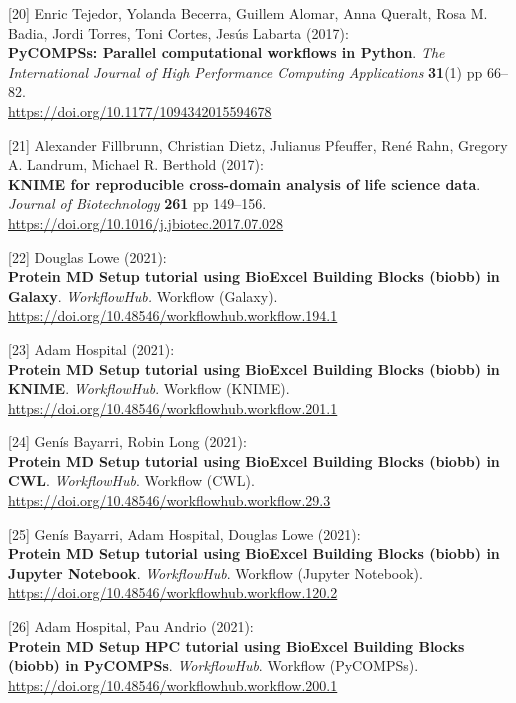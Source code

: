 {[}20{]} Enric Tejedor, Yolanda Becerra, Guillem Alomar, Anna Queralt,
Rosa M. Badia, Jordi Torres, Toni Cortes, Jesús Labarta (2017):\\
\textbf{PyCOMPSs: Parallel computational workflows in Python}. \emph{The
International Journal of High Performance Computing Applications}
\textbf{31}(1) pp 66--82.\\
\url{https://doi.org/10.1177/1094342015594678}

{[}21{]} Alexander Fillbrunn, Christian Dietz, Julianus Pfeuffer, René
Rahn, Gregory A. Landrum, Michael R. Berthold (2017):\\
\textbf{KNIME for reproducible cross-domain analysis of life science
data}. \emph{Journal of Biotechnology} \textbf{261} pp 149--156.\\
\url{https://doi.org/10.1016/j.jbiotec.2017.07.028}

{[}22{]} Douglas Lowe (2021):\\
\textbf{Protein MD Setup tutorial using BioExcel Building Blocks (biobb)
in Galaxy}. \emph{WorkflowHub.} Workflow (Galaxy).\\
\url{https://doi.org/10.48546/workflowhub.workflow.194.1}

{[}23{]} Adam Hospital (2021):\\
\textbf{Protein MD Setup tutorial using BioExcel Building Blocks (biobb)
in KNIME}. \emph{WorkflowHub}. Workflow (KNIME).\\
\url{https://doi.org/10.48546/workflowhub.workflow.201.1}

{[}24{]} Genís Bayarri, Robin Long (2021):\\
\textbf{Protein MD Setup tutorial using BioExcel Building Blocks (biobb)
in CWL}. \emph{WorkflowHub}. Workflow (CWL).\\
\url{https://doi.org/10.48546/workflowhub.workflow.29.3}

{[}25{]} Genís Bayarri, Adam Hospital, Douglas Lowe (2021):\\
\textbf{Protein MD Setup tutorial using BioExcel Building Blocks (biobb)
in Jupyter Notebook}. \emph{WorkflowHub}. Workflow (Jupyter Notebook).\\
\url{https://doi.org/10.48546/workflowhub.workflow.120.2}

{[}26{]} Adam Hospital, Pau Andrio (2021):\\
\textbf{Protein MD Setup HPC tutorial using BioExcel Building Blocks
(biobb) in PyCOMPSs}. \emph{WorkflowHub}. Workflow (PyCOMPSs).\\
\url{https://doi.org/10.48546/workflowhub.workflow.200.1}

